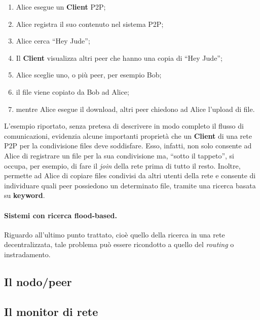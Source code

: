 \begin{enumerate}

 \item Alice esegue un \textbf{Client} P2P;

 \item Alice registra il suo contenuto nel sistema P2P;

 \item Alice cerca ``Hey Jude'';

 \item Il \textbf{Client} visualizza altri peer che hanno una copia di ``Hey
       Jude'';

 \item Alice sceglie uno, o più peer, per esempio Bob;

 \item il file viene copiato da Bob ad Alice;

 \item mentre Alice esegue il download, altri peer chiedono ad Alice l'upload
       di file.

\end{enumerate}

L'esempio riportato, senza pretesa di descrivere in modo completo il flusso di
comunicazioni, evidenzia alcune importanti proprietà che un \textbf{Client} di
una rete P2P per la condivisione files deve soddisfare. Esso, infatti, non solo
consente ad Alice di registrare un file per la sua condivisione ma, ``sotto il
tappeto'', si occupa, per esempio, di fare il \textit{join} della rete prima di
tutto il resto. Inoltre, permette ad Alice di copiare files condivisi da altri
utenti della rete e consente di individuare quali peer possiedono un determinato
file, tramite una ricerca basata su \textbf{keyword}.

\paragraph{Sistemi con ricerca flood-based.} Riguardo all'ultimo punto trattato,
cioè quello della ricerca in una rete decentralizzata, tale problema può essere
ricondotto a quello del \textit{routing} o instradamento.


\subsection{Il nodo/peer}


\subsection{Il monitor di rete}
